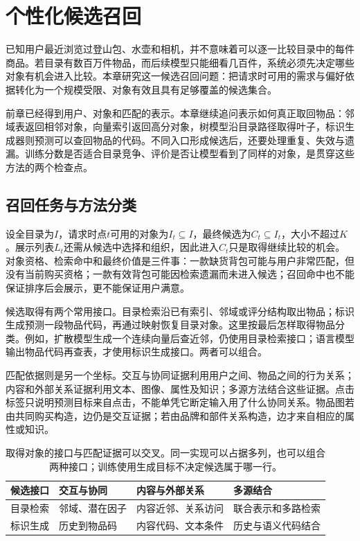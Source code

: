 \chapter{个性化候选召回}
\label{chap:rs-retrieval}

已知用户最近浏览过登山包、水壶和相机，并不意味着可以逐一比较目录中的每件商品。若目录有数百万件物品，而后续模型只能细看几百件，系统必须先决定哪些对象有机会进入比较。本章研究这一候选召回问题：把请求时可用的需求与偏好依据转化为一个规模受限、对象有效且具有足够覆盖的候选集合。

前章已经得到用户、对象和匹配的表示。本章继续追问表示如何真正取回物品：邻域表返回相邻对象，向量索引返回高分对象，树模型沿目录路径取得叶子，标识生成器则预测可以查回物品的代码。不同入口形成候选后，还要处理重复、失效与遗漏。训练分数是否适合目录竞争、评价是否让模型看到了同样的对象，是贯穿这些方法的两个检查点。

\section{召回任务与方法分类}
\label{sec:rs-retrieval-task}

设全目录为$I$，请求时点$t$可用的对象为$I_t\subseteq I$，最终候选为$C_t\subseteq I_t$，大小不超过$K$。展示列表$L_t$还需从候选中选择和组织，因此进入$C_t$只是取得继续比较的机会。对象资格、检索命中和最终价值是三件事：一款缺货背包可能与用户非常匹配，但没有当前购买资格；一款有效背包可能因检索遗漏而未进入候选；召回命中也不能保证排序后会展示，更不能保证用户满意。

候选取得有两个常用接口。目录检索沿已有索引、邻域或评分结构取出物品；标识生成预测一段物品代码，再通过映射恢复目录对象。这里按最后怎样取得物品分类。例如，扩散模型生成一个连续向量后查近邻，仍使用目录检索接口；语言模型输出物品代码再查表，才使用标识生成接口。两者可以组合。

匹配依据则是另一个坐标。交互与协同证据利用用户之间、物品之间的行为关系；内容和外部关系证据利用文本、图像、属性及知识；多源方法结合这些证据。点击标签只说明预测目标来自点击，不能单凭它断定输入用了什么协同关系。物品图若由共同购买构造，边仍是交互证据；若由品牌和部件关系构造，边才来自相应的属性或知识。

\begin{table}[htbp]
  \centering\small
  \begin{tabularx}{\linewidth}{@{}lXXX@{}}
    \toprule
    候选接口 & 交互与协同 & 内容与外部关系 & 多源结合 \\
    \midrule
    目录检索 & 邻域、潜在因子 & 内容近邻、关系访问 & 联合表示和多路检索 \\
    标识生成 & 历史到物品码 & 内容代码、文本条件 & 历史与语义代码结合 \\
    \bottomrule
  \end{tabularx}
  \caption{取得对象的接口与匹配证据可以交叉。同一实现可以占据多列，也可以组合两种接口；训练使用生成目标不决定候选属于哪一行。}
  \label{tab:rs-retrieval-axes}
\end{table}

